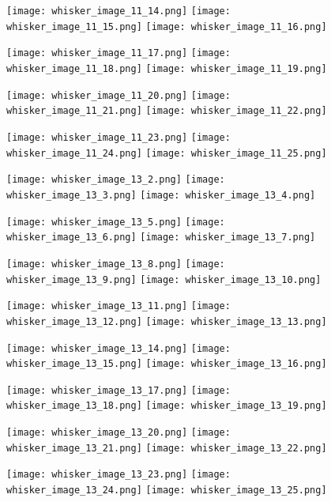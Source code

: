 \documentclass[12pt]{article}
\begin{document}
\begin{figure}
	\centerline{
		\texttt{[image: whisker\_image\_11\_14.png]}
		\texttt{[image: whisker\_image\_11\_15.png]}
		\texttt{[image: whisker\_image\_11\_16.png]}
	}
	\centerline{
		\texttt{[image: whisker\_image\_11\_17.png]}
		\texttt{[image: whisker\_image\_11\_18.png]}
		\texttt{[image: whisker\_image\_11\_19.png]}
	}
	\centerline{
		\texttt{[image: whisker\_image\_11\_20.png]}
		\texttt{[image: whisker\_image\_11\_21.png]}
		\texttt{[image: whisker\_image\_11\_22.png]}
	}
	\centerline{
		\texttt{[image: whisker\_image\_11\_23.png]}
		\texttt{[image: whisker\_image\_11\_24.png]}
		\texttt{[image: whisker\_image\_11\_25.png]}
	}
\end{figure}

\begin{figure}
	\centerline{
		\texttt{[image: whisker\_image\_13\_2.png]}
		\texttt{[image: whisker\_image\_13\_3.png]}
		\texttt{[image: whisker\_image\_13\_4.png]}
	}
	\centerline{
		\texttt{[image: whisker\_image\_13\_5.png]}
		\texttt{[image: whisker\_image\_13\_6.png]}
		\texttt{[image: whisker\_image\_13\_7.png]}
	}
	\centerline{
		\texttt{[image: whisker\_image\_13\_8.png]}
		\texttt{[image: whisker\_image\_13\_9.png]}
		\texttt{[image: whisker\_image\_13\_10.png]}
	}
	\centerline{
		\texttt{[image: whisker\_image\_13\_11.png]}
		\texttt{[image: whisker\_image\_13\_12.png]}
		\texttt{[image: whisker\_image\_13\_13.png]}
	}
\end{figure}

\begin{figure}
	\centerline{
		\texttt{[image: whisker\_image\_13\_14.png]}
		\texttt{[image: whisker\_image\_13\_15.png]}
		\texttt{[image: whisker\_image\_13\_16.png]}
	}
	\centerline{
		\texttt{[image: whisker\_image\_13\_17.png]}
		\texttt{[image: whisker\_image\_13\_18.png]}
		\texttt{[image: whisker\_image\_13\_19.png]}
	}
	\centerline{
		\texttt{[image: whisker\_image\_13\_20.png]}
		\texttt{[image: whisker\_image\_13\_21.png]}
		\texttt{[image: whisker\_image\_13\_22.png]}
	}
	\centerline{
		\texttt{[image: whisker\_image\_13\_23.png]}
		\texttt{[image: whisker\_image\_13\_24.png]}
		\texttt{[image: whisker\_image\_13\_25.png]}
	}
\end{figure}
\end{document}
